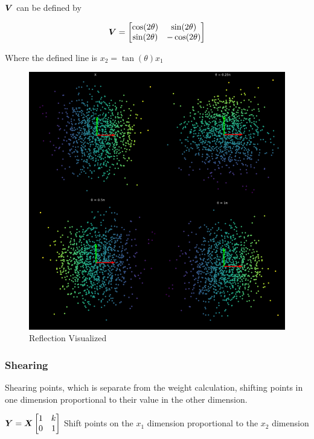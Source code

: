 \(\bm{V}\) can be defined by

\[
\bm{V} = 
\begin{bmatrix}
    \cos(2\theta) & \sin(2\theta)\\
    \sin(2\theta) & -\cos(2\theta)
\end{bmatrix}
\]

Where the defined line is \(x_2 = \tan(\theta) x_1 \)

\begin{figure}[h!]
\begin{center}
\includegraphics{labs/01/images/Reflection.png}
\end{center} 
\caption{Reflection Visualized}
\label{fig:mon}
\end{figure}

\subsubsection{Shearing}
Shearing points, which is separate from the weight calculation, shifting points in one dimension proportional to their value in the other dimension.

\(\bm{Y} = \bm{X}  \begin{bmatrix}
    1 & k\\
    0 & 1
\end{bmatrix} \) 
Shift points on the \(x_1\) dimension proportional to the \(x_2\) dimension

